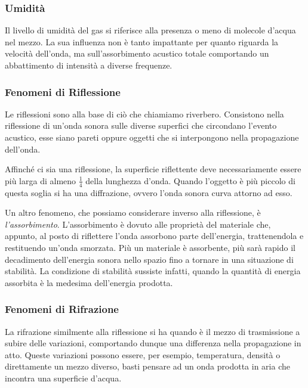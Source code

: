 \subsubsection{Umidità}
Il livello di umidità del gas si riferisce alla presenza o meno di molecole d’acqua nel mezzo. La sua influenza non è tanto impattante per quanto riguarda la velocità dell’onda, ma sull’assorbimento acustico totale comportando un abbattimento di intensità a diverse frequenze.
\subsubsection{Fenomeni di Riflessione}
Le riflessioni sono alla base di ciò che chiamiamo riverbero.
Consistono nella riflessione di un’onda sonora sulle diverse superfici che 
circondano l’evento acustico, esse siano pareti oppure oggetti che si interpongono
nella propagazione dell’onda.

Affinché ci sia una riflessione, la superficie riflettente deve necessariamente essere
più larga di almeno $\frac{1}{4}$ della lunghezza d’onda.
Quando l’oggetto è più piccolo di questa soglia si ha una diffrazione, ovvero l’onda sonora curva attorno ad esso.

Un altro fenomeno, che possiamo considerare inverso alla riflessione, è \emph{l’assorbimento}.
L’assorbimento è dovuto alle proprietà del materiale che, appunto, al posto di riflettere l’onda assorbono parte dell’energia, trattenendola e restituendo un’onda smorzata.
Più un materiale è assorbente, più sarà rapido il decadimento dell’energia sonora nello spazio fino a tornare in una situazione di stabilità.
La condizione di stabilità sussiste infatti, quando la quantità di energia assorbita è la medesima dell’energia prodotta.
\subsubsection{Fenomeni di Rifrazione}
La rifrazione similmente alla riflessione si ha quando è il mezzo di trasmissione a subire delle variazioni, comportando dunque una differenza nella propagazione in atto. Queste variazioni possono essere, per esempio, temperatura, densità o direttamente un mezzo diverso, basti pensare ad un onda prodotta in aria che incontra una superficie d’acqua.
